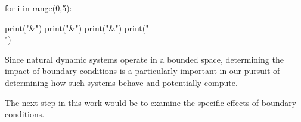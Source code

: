 \iffalse
\begin{python}

for i in range(0,5):

    print("&")
    print("&")   
    print("&")
    print("\\")
\end{python}


\makeatletter
\newwrite\Code@out

\newcommand\python{\obeylines\expandafter\pythonArg\noexpand}

\newcommand\pythonArg[1][tmp.py.in]{%
    \gdef\FNameIn{#1}
    \gdef\FNameOut{tmp.py.out}
    \begingroup
        \@bsphack%
        \immediate\openout\Code@out\FNameIn%
        \let\do\@makeother\dospecials%
        \catcode`\^^M\active%
        \def\verbatim@processline{%
            \immediate\write\Code@out{\the\verbatim@line}}%
        \verbatim@start}

\def\endpython{%
        \immediate\closeout\Code@out\@esphack
    \endgroup

     \immediate\write18{python \FNameIn > \FNameOut}
     
}

\makeatother


\iffalse
\begin{itemize}
\item Replication/Setup of Wootter/Langton Experiment
\item Lambda Profile of Irregular Grids
\item Lambda Profile of Penrose? (glider lambda?)
\item Lambda Degeneration (simple): TODO run MSE on these graphs
\item Lambda Degeneration (crosshatching)
\end{itemize}
\fi

Since natural dynamic systems operate in a bounded space, determining the impact of boundary conditions is a particularly important in our pursuit of determining how such systems behave and potentially compute. 

The next step in this work would be to examine the specific effects of boundary conditions.

